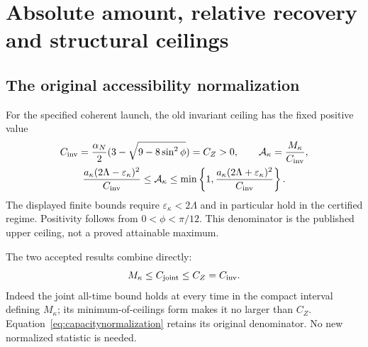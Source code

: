 \section{Absolute amount, relative recovery and structural ceilings}\label{sec:amount}
\subsection{The original accessibility normalization}
For the specified coherent launch, the old invariant ceiling has the fixed positive value
\begin{equation}\label{eq:capacitynormalization}%
\begin{gathered}
C_{\rm inv}=\frac{\alpha_N}{2}(3-\sqrt{9-8\sin^2\phi})=C_Z>0,\qquad
\mathcal A_\kappa=\frac{M_\kappa}{C_{\rm inv}},\\
\frac{a_\kappa(2\Lambda-\varepsilon_\kappa)^2}{C_{\rm inv}}
\le\mathcal A_\kappa
\le\min\left\{1,\frac{a_\kappa(2\Lambda+\varepsilon_\kappa)^2}{C_{\rm inv}}\right\}.
\end{gathered}
\end{equation}
The displayed finite bounds require $\varepsilon_\kappa<2\Lambda$ and in particular hold in the certified regime. Positivity follows from $0<\phi<\pi/12$. This denominator is the published upper ceiling, not a proved attainable maximum.

The two accepted results combine directly:
\begin{equation}\label{eq:synthesis}%
M_\kappa\le C_{\rm joint}\le C_Z=C_{\rm inv}.
\end{equation}
Indeed the joint all-time bound holds at every time in the compact interval defining $M_\kappa$; its minimum-of-ceilings form makes it no larger than $C_Z$. Equation~\eqref{eq:capacitynormalization} retains its original denominator. No new normalized statistic is needed.

